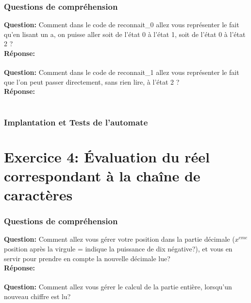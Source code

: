 \documentclass[./standalone.tex]{subfiles}
\begin{document}
\subsubsection{Questions de compréhension}
\medskip

\textbf{Question:} Comment dans le code de reconnait\_0 allez vous représenter le fait qu'en lisant un a, on puisse aller soit de l'état 0 à l'état 1, soit de l'état 0 à l'état 2 ?\\

\textbf{Réponse:} \\\\


\textbf{Question:} Comment dans le code de reconnait\_1 allez vous représenter le fait que l'on peut passer directement, sans rien lire, à l'état 2 ?\\

\textbf{Réponse:} \\\\

\subsubsection{Implantation et Tests de l'automate}
\newpage




\section{Exercice 4: Évaluation du réel correspondant à la chaîne de caractères}
\bigskip

\subsubsection{Questions de compréhension}
\medskip

\textbf{Question:} Comment allez vous gérer votre position dans la partie décimale ($x^{eme}$ position après la virgule = indique la puissance de dix négative?), et vous en servir pour prendre en compte la nouvelle décimale lue? \\

\textbf{Réponse:} \\\\


\textbf{Question:} Comment allez vous gérer le calcul de la partie entière, lorsqu'un nouveau chiffre est lu? \\
\end{document}
